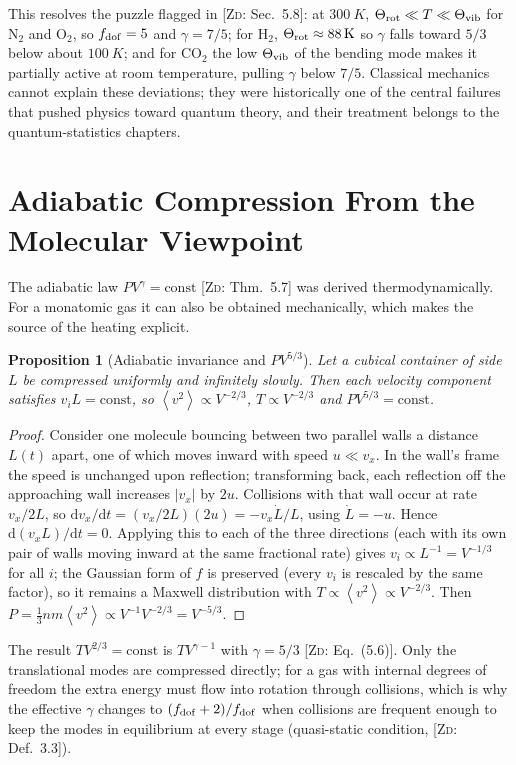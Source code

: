 \documentclass[11pt,a4paper]{report}
\theoremstyle{definition}
\theoremstyle{plain}
\newtheorem{proposition}[definition]{Proposition}
\newcommand{\ZD}[1]{[\textsc{Zd}: #1]}   %
\newcommand{\dd}{\mathrm{d}}
\newcommand{\avg}[1]{\left\langle #1\right\rangle}
\begin{document}
This resolves the puzzle flagged in \ZD{Sec.~5.8}: at $\SI{300}{K}$, $\Theta_{\rm rot}\ll T\ll\Theta_{\rm vib}$ for N$_2$ and O$_2$, so $f_{\rm dof}=5$ and $\gamma=7/5$; for H$_2$, $\Theta_{\rm rot}\approx\SI{88}{K}$ so $\gamma$ falls toward $5/3$ below about $\SI{100}{K}$; and for CO$_2$ the low $\Theta_{\rm vib}$ of the bending mode makes it partially active at room temperature, pulling $\gamma$ below $7/5$. Classical mechanics cannot explain these deviations; they were historically one of the central failures that pushed physics toward quantum theory, and their treatment belongs to the quantum-statistics chapters.

\section{Adiabatic Compression From the Molecular Viewpoint}
\label{sec:adiabatic}

The adiabatic law $PV^{\gamma}=\text{const}$ \ZD{Thm.~5.7} was derived thermodynamically. For a monatomic gas it can also be obtained mechanically, which makes the source of the heating explicit.

\begin{proposition}[Adiabatic invariance and $PV^{5/3}$]\label{prop:adiab}
Let a cubical container of side $L$ be compressed uniformly and infinitely slowly. Then each velocity component satisfies $v_iL=\text{const}$, so $\avg{v^2}\propto V^{-2/3}$, $T\propto V^{-2/3}$ and $PV^{5/3}=\text{const}$.
\end{proposition}
\begin{proof}
Consider one molecule bouncing between two parallel walls a distance $L(t)$ apart, one of which moves inward with speed $u\ll v_x$. In the wall's frame the speed is unchanged upon reflection; transforming back, each reflection off the approaching wall increases $|v_x|$ by $2u$. Collisions with that wall occur at rate $v_x/2L$, so $\dd v_x/\dd t=(v_x/2L)(2u)=-v_x\dot L/L$, using $\dot L=-u$. Hence $\dd(v_xL)/\dd t=0$. Applying this to each of the three directions (each with its own pair of walls moving inward at the same fractional rate) gives $v_i\propto L^{-1}=V^{-1/3}$ for all $i$; the Gaussian form of $f$ is preserved (every $v_i$ is rescaled by the same factor), so it remains a Maxwell distribution with $T\propto\avg{v^2}\propto V^{-2/3}$. Then $P=\tfrac13nm\avg{v^2}\propto V^{-1}V^{-2/3}=V^{-5/3}$.
\end{proof}
The result $TV^{2/3}=\text{const}$ is $TV^{\gamma-1}$ with $\gamma=5/3$ \ZD{Eq.~(5.6)}. Only the translational modes are compressed directly; for a gas with internal degrees of freedom the extra energy must flow into rotation through collisions, which is why the effective $\gamma$ changes to $(f_{\rm dof}+2)/f_{\rm dof}$ when collisions are frequent enough to keep the modes in equilibrium at every stage (quasi-static condition, \ZD{Def.~3.3}).
\end{document}
